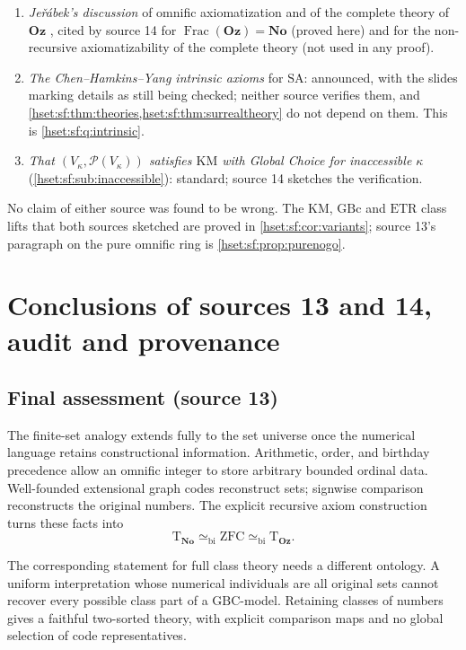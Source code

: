 \documentclass[11pt,letterpaper]{article}
\theoremstyle{definition}
\theoremstyle{remark}
\newcommand{\No}{\mathbf{No}}
\newcommand{\Pow}{\mathcal P}
\newcommand{\ZFC}{\mathrm{ZFC}}
\newcommand{\Oz}{\mathbf{Oz}}
\newcommand{\Frac}{\operatorname{Frac}}
\newcommand{\GBc}{\mathrm{GBc}}
\newcommand{\GBC}{\mathrm{GBC}}
\newcommand{\KM}{\mathrm{KM}}
\newcommand{\ETR}{\mathrm{ETR}}
\newcommand{\SAth}{\mathrm{SA}}
\newcommand{\Tth}{\mathrm{T}}
\newcommand{\bi}{\simeq_{\mathrm{bi}}}
\begin{document}
\begin{enumerate}[label=(\arabic*)]
\item \emph{Je\v{r}\'abek's discussion} of omnific axiomatization and of the complete
theory of $\Oz$ \cite{JerabekOz}, cited by source 14 for $\Frac(\Oz)=\No$ (proved
here) and for the non-recursive axiomatizability of the complete theory (not used in
any proof).
\item \emph{The Chen--Hamkins--Yang intrinsic axioms} for $\SAth$: announced, with the
slides marking details as still being checked; neither source verifies them, and
\cref{hset:sf:thm:theories,hset:sf:thm:surrealtheory} do not depend on them. This is
\cref{hset:sf:q:intrinsic}.
\item \emph{That $(V_\kappa,\Pow(V_\kappa))$ satisfies $\KM$ with Global Choice for
inaccessible $\kappa$} (\cref{hset:sf:sub:inaccessible}): standard; source 14
sketches the verification.
\end{enumerate}
No claim of either source was found to be wrong. The KM, $\GBc$ and $\ETR$ class
lifts that both sources sketched are proved in \cref{hset:sf:cor:variants}; source
13's paragraph on the pure omnific ring is \cref{hset:sf:prop:purenogo}.

\section{Conclusions of sources 13 and 14, audit and provenance}
\label{hset:sf:sec:provenance}

\subsection{Final assessment (source 13)}

The finite-set analogy extends fully to the set universe once the numerical language
retains constructional information. Arithmetic, order, and birthday precedence allow
an omnific integer to store arbitrary bounded ordinal data. Well-founded extensional
graph codes reconstruct sets; signwise comparison reconstructs the original numbers.
The explicit recursive axiom construction turns these facts into
\[
 \Tth_{\No}\bi\ZFC\bi\Tth_{\Oz}.
\]

The corresponding statement for full class theory needs a different ontology. A
uniform interpretation whose numerical individuals are all original sets cannot
recover every possible class part of a $\GBC$-model. Retaining classes of numbers
gives a faithful two-sorted theory, with explicit comparison maps and no global
selection of code representatives.
\end{document}
